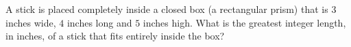 A stick is placed completely inside a closed box (a rectangular prism) that is $3$ inches wide, $4$ inches long and $5$ inches high. What is the greatest integer length, in inches, of a stick that fits entirely inside the box?
